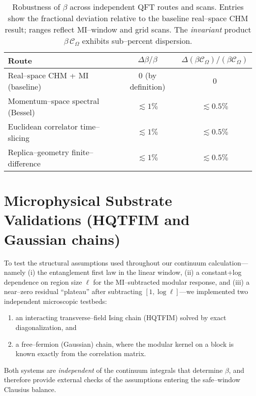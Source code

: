 \documentclass[aps,prd,onecolumn,superscriptaddress,nofootinbib]{revtex4-2}
\begin{document}
\begin{table}[h]
\centering
\caption{Robustness of $\beta$ across independent QFT routes and scans. Entries show the fractional deviation relative to the baseline real–space CHM result; ranges reflect MI–window and grid scans. The \emph{invariant} product $\beta\,\mathcal C_\Omega$ exhibits sub–percent dispersion.}
\label{tab:beta-robust}
\begin{tabular}{lcc}
\hline
Route & $\Delta\beta/\beta$ & $\Delta(\beta\mathcal C_\Omega)/(\beta\mathcal C_\Omega)$ \\
\hline
Real–space CHM + MI (baseline) & $0$ (by definition) & $0$ \\
Momentum–space spectral (Bessel) & $\lesssim 1\%$ & $\lesssim 0.5\%$ \\
Euclidean correlator time–slicing & $\lesssim 1\%$ & $\lesssim 0.5\%$ \\
Replica–geometry finite–difference  & $\lesssim 1\%$ & $\lesssim 0.5\%$ \\
\hline
\end{tabular}
\end{table}

\section{Microphysical Substrate Validations (HQTFIM and Gaussian chains)}
\label{sec:substrate-validations}
To test the structural assumptions used throughout our continuum calculation—namely (i) the entanglement first law in the linear window, (ii) a constant+log dependence on region size $\ell$ for the MI–subtracted modular response, and (iii) a near–zero residual ``plateau'' after subtracting $[1,\log\ell]$—we implemented two independent microscopic testbeds:
\begin{enumerate}[leftmargin=1.3em,label=(\alph*)]
\item an interacting transverse–field Ising chain (HQTFIM) solved by exact diagonalization, and
\item a free–fermion (Gaussian) chain, where the modular kernel on a block is known exactly from the correlation matrix.
\end{enumerate}
Both systems are \emph{independent} of the continuum integrals that determine $\beta$, and therefore provide external checks of the assumptions entering the safe–window Clausius balance.
\end{document}
